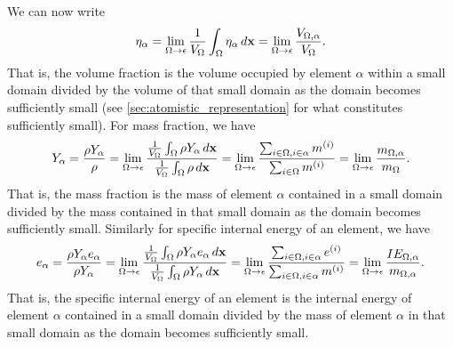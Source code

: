 \documentclass[oneside,a4paper,11pt]{report}
\begin{document}
We can now write 
\begin{equation}
    \label{eq:atomistic_mix_eta}
    \eta_\alpha = \lim_{\Omega \to \epsilon} \frac{1}{V_\Omega} \int_\Omega \eta_\alpha \, d\mathbf{x} = \lim_{\Omega \to \epsilon} \frac{V_{\Omega,\alpha}}{V_\Omega}.
\end{equation}
That is, the volume fraction is the volume occupied by element $\alpha$ within a small domain divided by the volume of that small domain as the domain becomes sufficiently small (see \cref{sec:atomistic_representation} for what constitutes sufficiently small).
For mass fraction, we have
\begin{equation}
    \label{eq:atomistic_mix_Y}
    Y_\alpha = \frac{\rho Y_\alpha}{\rho} = \lim_{\Omega \to \epsilon} \frac{ \frac{1}{V_\Omega} \int_\Omega \rho Y_\alpha \, d\mathbf{x} }{ \frac{1}{V_\Omega} \int_\Omega \rho \, d\mathbf{x} } = \lim_{\Omega \to \epsilon} \frac{ \sum_{i \in \Omega, i \in \alpha} m^{(i)} }{ \sum_{i \in \Omega} m^{(i)} } = \lim_{\Omega \to \epsilon} \frac{ m_{\Omega,\alpha} }{ m_\Omega }.
\end{equation}
That is, the mass fraction is the mass of element $\alpha$ contained in a small domain divided by the mass contained in that small domain as the domain becomes sufficiently small. Similarly for specific internal energy of an element, we have
\begin{equation}
    \label{eq:atomistic_mix_e}
    e_\alpha = \frac{\rho Y_\alpha e_\alpha}{\rho Y_\alpha } = \lim_{\Omega \to \epsilon} \frac{ \frac{1}{V_\Omega} \int_\Omega \rho Y_\alpha e_\alpha \, d\mathbf{x} }{ \frac{1}{V_\Omega} \int_\Omega \rho Y_\alpha \, d\mathbf{x} } = \lim_{\Omega \to \epsilon} \frac{ \sum_{i \in \Omega, i \in \alpha} e^{(i)} }{ \sum_{i \in \Omega, i \in \alpha} m^{(i)} } = \lim_{\Omega \to \epsilon} \frac{ IE_{\Omega,\alpha} }{ m_{\Omega,\alpha} }.
\end{equation}
That is, the specific internal energy of an element is the internal energy of element $\alpha$ contained in a small domain divided by the mass of element $\alpha$ in that small domain as the domain becomes sufficiently small.
\end{document}
